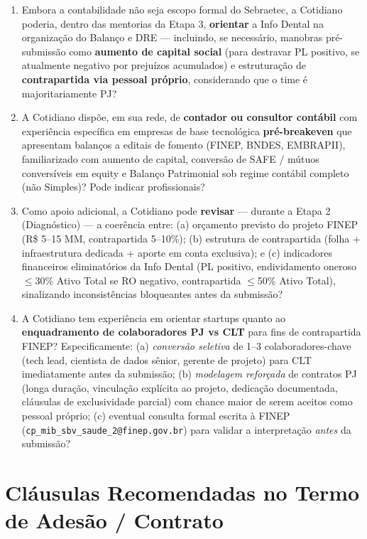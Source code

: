 \documentclass[11pt, a4paper]{article}
\begin{document}
\begin{enumerate}[label=\textcolor{primaryColor}{\textbf{P\arabic*.}}, leftmargin=2.2em, start=21]
    \item Embora a contabilidade não seja escopo formal do Sebraetec, a Cotidiano poderia, dentro das mentorias da Etapa 3, \textbf{orientar} a Info Dental na organização do Balanço e DRE --- incluindo, se necessário, manobras pré-submissão como \textbf{aumento de capital social} (para destravar PL positivo, se atualmente negativo por prejuízos acumulados) e estruturação de \textbf{contrapartida via pessoal próprio}, considerando que o time é majoritariamente PJ?
    \item A Cotidiano dispõe, em sua rede, de \textbf{contador ou consultor contábil} com experiência específica em empresas de base tecnológica \textbf{pré-breakeven} que apresentam balanços a editais de fomento (FINEP, BNDES, EMBRAPII), familiarizado com aumento de capital, conversão de SAFE / mútuos conversíveis em equity e Balanço Patrimonial sob regime contábil completo (não Simples)? Pode indicar profissionais?
    \item Como apoio adicional, a Cotidiano pode \textbf{revisar} --- durante a Etapa 2 (Diagnóstico) --- a coerência entre: (a) orçamento previsto do projeto FINEP (R\$ 5--15 MM, contrapartida 5--10\%); (b) estrutura de contrapartida (folha + infraestrutura dedicada + aporte em conta exclusiva); e (c) indicadores financeiros eliminatórios da Info Dental (PL positivo, endividamento oneroso $\leq$30\% Ativo Total se RO negativo, contrapartida $\leq$50\% Ativo Total), sinalizando inconsistências bloqueantes antes da submissão?
    \item A Cotidiano tem experiência em orientar startups quanto ao \textbf{enquadramento de colaboradores PJ vs CLT} para fins de contrapartida FINEP? Especificamente: (a) \emph{conversão seletiva} de 1--3 colaboradores-chave (tech lead, cientista de dados sênior, gerente de projeto) para CLT imediatamente antes da submissão; (b) \emph{modelagem reforçada} de contratos PJ (longa duração, vinculação explícita ao projeto, dedicação documentada, cláusulas de exclusividade parcial) com chance maior de serem aceitos como pessoal próprio; (c) eventual consulta formal escrita à FINEP (\texttt{cp\_mib\_sbv\_saude\_2@finep.gov.br}) para validar a interpretação \emph{antes} da submissão?
\end{enumerate}

\section{Cláusulas Recomendadas no Termo de Adesão / Contrato}
\end{document}

